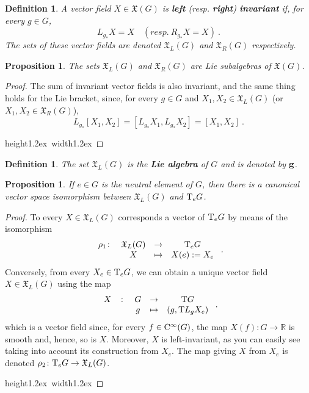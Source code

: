 \documentclass[12pt]{report}
\newtheorem{prop}[teor]{Proposition}
\newtheorem{definition}[teor]{Definition}
\def\qed{\ifvmode\removelastskip\fi
{\unskip\nobreak\hfil\penalty50\hbox{}\nobreak\hfil
\hbox{\vrule height1.2ex width1.2ex}\parfillskip=0pt
\finalhyphendemerits=0 \par\smallskip}}
\def\vf{\mathfrak X}
\def\Real{\mathbb{R}}
\def\Tan{{\rm T}}
\def\Cinfty{{\rm C}^\infty}
\begin{document}
\begin{appendix}
\begin{definition}
A vector field $X \in\vf(G)$ is
\textbf{left} (resp. \textbf{right}) \textbf{invariant}
if, for every $g \in G$,
$$
L_{g_*}X = X \quad  (resp. \ R_{g_*}X = X) \ .
$$
The sets of these vector fields are denoted
$\vf_L(G)$ and $\vf_R(G)$ respectively.
\end{definition}

\begin{prop}
The sets $\vf_L(G)$ and $\vf_R(G)$ are Lie subalgebras of $\vf(G)$.
\end{prop}
\begin{proof}
The sum of invariant vector fields is also invariant, 
and the same thing holds for the Lie bracket, 
since, for every $g \in G$ and $X_1,X_2 \in\vf_L(G)$ (or $X_1,X_2 \in\vf_R(G)$),
$$
L_{g_*}[X_1,X_2] = [L_{g_*}X_1,L_{g_*}X_2]=[X_1,X_2] \ .
$$
\qed  \end{proof}

\begin{definition}
The set $\vf_L(G)$ is the
\textbf{Lie algebra} of $G$ and is denoted by ${\bf g}$.
\end{definition}

\begin{prop}
If $e\in G$ is the neutral element of $G$, then there is a
canonical vector space isomorphism between 
$\vf_L(G)$ and $\Tan_eG$.
\end{prop}
\begin{proof}
To every $X\in\vf_L(G)$ corresponds a vector of
$\Tan_eG$ by means of the isomorphism
$$
\begin{array}{cccc}
\rho_1 \colon &\vf_L(G)&\to&\Tan_eG
\\
&X&\mapsto&X(e):=X_e
\end{array} \ .
$$
Conversely, from every $X_e \in \Tan_eG$,
we can obtain a unique vector field $X \in\vf_L(G)$
using the map
$$
\begin{array}{ccccc}
X&\colon&G&\to&\Tan G
\\
& &g&\mapsto&(g,\Tan L_gX_e)
\end{array} \ .
$$
which is a vector field since, for every $f \in \Cinfty(G)$, 
the map $X(f) \colon G \to \Real$
is smooth and, hence, so is $X$.
Moreover, $X$ is left-invariant, as you can easily see
taking into account its construction from $X_e$.
The map giving $X$ from $X_e$ is denoted $\rho_2 \colon \Tan_eG \to\vf_L(G)$.
\\ \qed  \end{proof}


\end{appendix}
\end{document}
